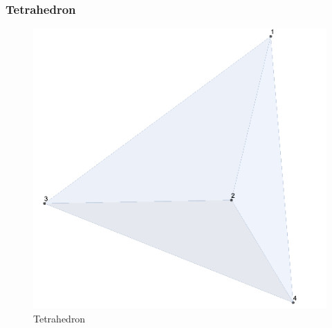 \documentclass{beamer}
\begin{document}

\begin{frame}
\frametitle{Tetrahedron}
    \begin{figure}[h] %
        \includegraphics[scale = 0.4]{Tetra.png} %
        \caption{Tetrahedron}
    \end{figure}
\end{frame}

\end{document}
